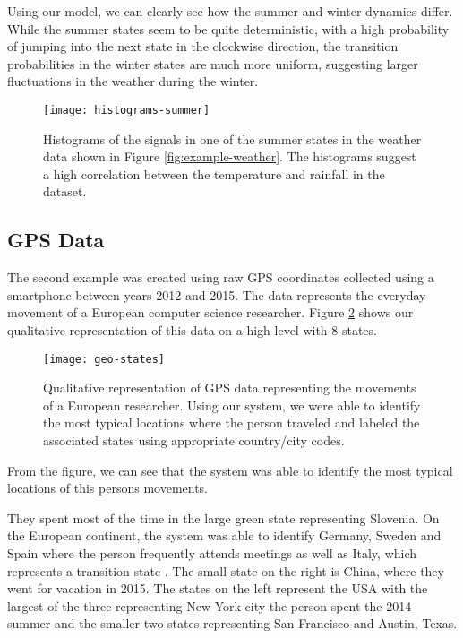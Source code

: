 Using our model, we can clearly see how the summer and winter dynamics differ. While the summer states seem to be quite deterministic, with a high probability of jumping into the next state in the clockwise direction, the transition probabilities in the winter states are much more uniform, suggesting larger fluctuations in the weather during the winter.

\begin{figure}[h!]
	\centering
	\texttt{[image: histograms-summer]}
	\caption{Histograms of the signals in one of the summer states in the weather data shown in Figure \ref{fig:example-weather}. The histograms suggest a high correlation between the temperature and rainfall in the dataset.}
	\label{fig:histograms-summer}
\end{figure}

\subsection{GPS Data}

The second example was created using raw GPS coordinates collected using a smartphone between years 2012 and 2015.
The data represents the everyday movement of a European computer science researcher. Figure \ref{fig:example-geo}
shows our qualitative representation of this data on a high level with 8 states.

\begin{figure}[h!]
	\centering
	\texttt{[image: geo-states]}
	\caption{Qualitative representation of GPS data representing the movements of a European researcher. Using our system, we were able to identify the most typical locations where the person traveled and labeled the associated states using appropriate country/city codes.}
	\label{fig:example-geo}
\end{figure}

From the figure, we can see that the system was able to identify the most typical locations of this persons
movements.

They spent most of the time in the large green state representing Slovenia. On the European continent, the system was able to identify Germany, Sweden and Spain where the person frequently attends meetings as well as Italy, which represents a transition state . The small state on the right is China, where they went for vacation in 2015. The states on the left represent the USA with the largest of the three representing New York city the person spent the 2014 summer and the smaller two states representing San Francisco and Austin, Texas.

